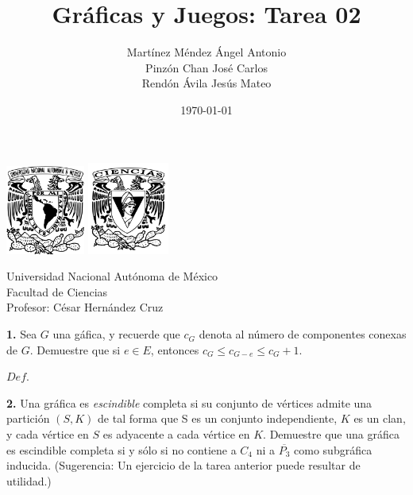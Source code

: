 \documentclass[12pt]{article}
\title{\textbf{Gráficas y Juegos: Tarea 02}}
\author{Martínez Méndez Ángel Antonio\\Pinzón Chan José Carlos\\Rendón Ávila Jesús Mateo}
\date{\today}
\begin{document}
\maketitle
\begin{center}
\vspace{3cm}
\includegraphics[width=0.195\textwidth]{Escudo.png}
\hspace{0.5cm}
\includegraphics[width=0.2\textwidth]{logo_ciencias.png}
\end{center}
\begin{center}
    \vspace{1cm}
    Universidad Nacional Autónoma de México\\
    Facultad de Ciencias\\
    Profesor: César Hernández Cruz\\
\end{center}

\newpage

%
%
\textbf{1.} Sea $G$ una gáfica, y recuerde que $c_G$ denota al número de componentes conexas de $G$.
Demuestre que si $e \in E$, entonces $c_G \leq c_{G - e} \leq c_G + 1$.\\

\begin{tcolorbox}[title=\textbf{Hipotesis}, colback=red!15!white, colframe=black!, breakable]

\end{tcolorbox}

\begin{tcolorbox}[title=\textbf{Definiciones}, colback=blue!15!white, colframe=black!, breakable]
    $Def$.
\end{tcolorbox}


\vspace{1cm}

%
%
\textbf{2.} Una gráfica es \textit{escindible} completa si su conjunto de vértices admite una partición $(S, K)$
de tal forma que S es un conjunto independiente, $K$ es un clan, y cada vértice en $S$ es
adyacente a cada vértice en $K$. Demuestre que una gráfica es escindible completa si y
sólo si no contiene a $C_4$ ni a $\overline{P_3}$ como subgráfica inducida. (Sugerencia: Un ejercicio de
la tarea anterior puede resultar de utilidad.)
\vspace{1cm}
\end{document}
